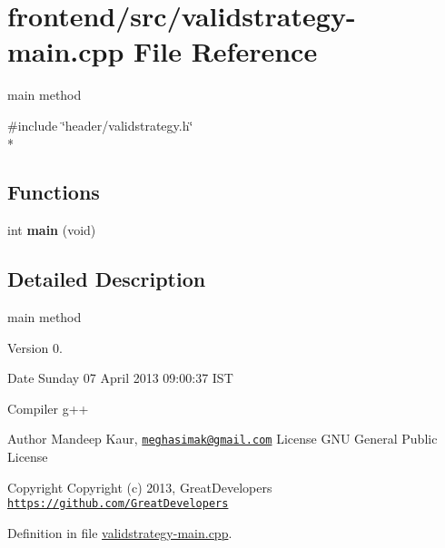 \hypertarget{validstrategy-main_8cpp}{\section{frontend/src/validstrategy-\/main.cpp File Reference}
\label{validstrategy-main_8cpp}
}


main method  


{\ttfamily \#include \char`\"{}header/validstrategy.\-h\char`\"{}}\\*
\subsection*{Functions}
\begin{DoxyCompactItemize}
\item 
\hypertarget{validstrategy-main_8cpp_a840291bc02cba5474a4cb46a9b9566fe}{int {\bfseries main} (void)}\label{validstrategy-main_8cpp_a840291bc02cba5474a4cb46a9b9566fe}

\end{DoxyCompactItemize}


\subsection{Detailed Description}
main method \begin{DoxyVersion}{Version}
0. 
\end{DoxyVersion}
\begin{DoxyDate}{Date}
Sunday 07 April 2013 09\-:00\-:37 I\-S\-T\par
 Compiler g++
\end{DoxyDate}
\begin{DoxyAuthor}{Author}
Mandeep Kaur, \href{mailto:meghasimak@gmail.com}{\tt meghasimak@gmail.\-com} License G\-N\-U General Public License 
\end{DoxyAuthor}
\begin{DoxyCopyright}{Copyright}
Copyright (c) 2013, Great\-Developers \href{https://github.com/GreatDevelopers}{\tt https\-://github.\-com/\-Great\-Developers} 
\end{DoxyCopyright}


Definition in file \hyperlink{validstrategy-main_8cpp_source}{validstrategy-\/main.\-cpp}.

